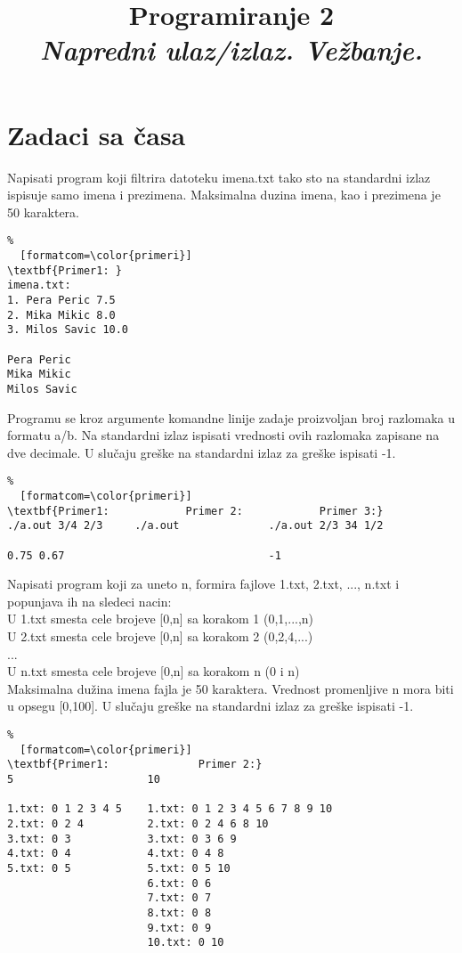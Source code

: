 \documentclass{article}
\title{{\bf Programiranje 2\\ \emph{Napredni ulaz/izlaz. Vežbanje.}}}
\begin{document}
\maketitle

\section{Zadaci sa časa}
\begin{z} Napisati program koji filtrira datoteku imena.txt tako sto na standardni izlaz ispisuje samo imena i prezimena. Maksimalna duzina imena, kao i prezimena je 50 karaktera.
\begin{Verbatim}%
  [formatcom=\color{primeri}]
\textbf{Primer1: }
imena.txt:
1. Pera Peric 7.5
2. Mika Mikic 8.0
3. Milos Savic 10.0

Pera Peric
Mika Mikic
Milos Savic
\end{Verbatim}  
\end{z}

\begin{z} Programu se kroz argumente komandne linije zadaje proizvoljan broj razlomaka u formatu a/b.
Na standardni izlaz ispisati vrednosti ovih razlomaka zapisane na dve decimale. U slučaju greške na standardni izlaz za greške ispisati -1.
\begin{Verbatim}%
  [formatcom=\color{primeri}]
\textbf{Primer1:            Primer 2:            Primer 3:}
./a.out 3/4 2/3     ./a.out              ./a.out 2/3 34 1/2

0.75 0.67                                -1
\end{Verbatim}  
\end{z}

\begin{z} 
Napisati program koji za uneto n, formira fajlove 1.txt, 2.txt, ..., n.txt i popunjava ih na sledeci nacin: \\
U 1.txt smesta cele brojeve [0,n] sa korakom 1 (0,1,...,n) \\
U 2.txt smesta cele brojeve [0,n] sa korakom 2 (0,2,4,...) \\
...\\
U n.txt smesta cele brojeve [0,n] sa korakom n (0 i n) \\
Maksimalna dužina imena fajla je 50 karaktera. Vrednost promenljive n mora biti u opsegu [0,100]. U slučaju greške na standardni izlaz za greške ispisati -1.
\begin{Verbatim}%
  [formatcom=\color{primeri}]
\textbf{Primer1:              Primer 2:}
5                     10

1.txt: 0 1 2 3 4 5    1.txt: 0 1 2 3 4 5 6 7 8 9 10
2.txt: 0 2 4          2.txt: 0 2 4 6 8 10
3.txt: 0 3            3.txt: 0 3 6 9
4.txt: 0 4            4.txt: 0 4 8
5.txt: 0 5            5.txt: 0 5 10
                      6.txt: 0 6
                      7.txt: 0 7
                      8.txt: 0 8
                      9.txt: 0 9
                      10.txt: 0 10
\end{Verbatim}  
\end{z}
\end{document}
